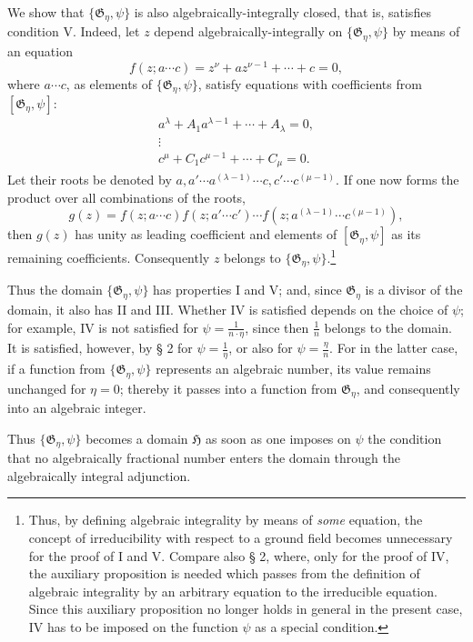 \documentclass[11pt]{article}
\begin{document}
We show that $\{\mathfrak G_\eta,\psi\}$ is also algebraically-integrally closed,
that is, satisfies condition V. Indeed, let $z$ depend algebraically-integrally
on $\{\mathfrak G_\eta,\psi\}$ by means of an equation
\[
 f(z;a\cdots c)=z^\nu+a z^{\nu-1}+\cdots+c=0,
\]
where $a\cdots c$, as elements of $\{\mathfrak G_\eta,\psi\}$, satisfy equations
with coefficients from $[\mathfrak G_\eta,\psi]$:
\[
\begin{gathered}
 a^\lambda+A_1a^{\lambda-1}+\cdots+A_\lambda=0,\\
 \vdots\\
 c^\mu+C_1c^{\mu-1}+\cdots+C_\mu=0.
\end{gathered}
\]
Let their roots be denoted by
$a,a'\cdots a^{(\lambda-1)}\cdots c,c'\cdots c^{(\mu-1)}$. If one now forms
the product over all combinations of the roots,
\[
 g(z)=f(z;a\cdots c)f(z;a'\cdots c')\cdots
      f(z;a^{(\lambda-1)}\cdots c^{(\mu-1)}),
\]
then $g(z)$ has unity as leading coefficient and elements of
$[\mathfrak G_\eta,\psi]$ as its remaining coefficients. Consequently $z$
belongs to $\{\mathfrak G_\eta,\psi\}$.\footnote{Thus, by defining
algebraic integrality by means of \emph{some} equation, the concept of
irreducibility with respect to a ground field becomes unnecessary for the proof
of I and V. Compare also § 2, where, only for the proof of IV, the auxiliary
proposition is needed which passes from the definition of algebraic integrality by
an arbitrary equation to the irreducible equation. Since this auxiliary proposition
no longer holds in general in the present case, IV has to be imposed on the
function $\psi$ as a special condition.}

Thus the domain $\{\mathfrak G_\eta,\psi\}$ has properties I and V; and, since
$\mathfrak G_\eta$ is a divisor of the domain, it also has II and III. Whether
IV is satisfied depends on the choice of $\psi$; for example, IV is not satisfied
for $\psi=\frac{1}{n\cdot\eta}$, since then $\frac1n$ belongs to the domain. It
is satisfied, however, by § 2 for $\psi=\frac1\eta$, or also for
$\psi=\frac{\eta}{n}$. For in the latter case, if a function from
$\{\mathfrak G_\eta,\psi\}$ represents an algebraic number, its value remains
unchanged for $\eta=0$; thereby it passes into a function from
$\mathfrak G_\eta$, and consequently into an algebraic integer.

Thus $\{\mathfrak G_\eta,\psi\}$ becomes a domain $\mathfrak H$ as soon as one
imposes on $\psi$ the condition that no algebraically fractional number enters the
domain through the algebraically integral adjunction.
\end{document}
